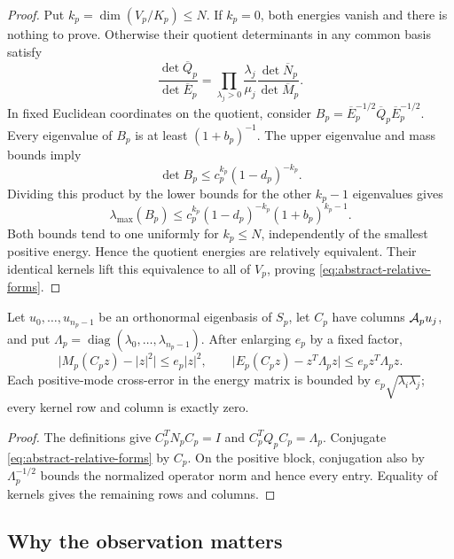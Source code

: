 \begin{proof}
Put $k_p=\dim(V_p/K_p)\le N$. If $k_p=0$, both energies vanish and
there is nothing to prove. Otherwise their quotient determinants in
any common basis satisfy
\begin{equation}\label{eq:quotient-determinant}
 \frac{\det\overline Q_p}{\det\overline E_p}
   =\prod_{\lambda_j>0}\frac{\lambda_j}{\mu_j}
           \frac{\det\overline N_p}{\det\overline M_p}.
\end{equation}
In fixed Euclidean coordinates on the quotient, consider
$B_p=\overline E_p^{-1/2}\overline Q_p\overline E_p^{-1/2}$.
Every eigenvalue of $B_p$ is at least $(1+b_p)^{-1}$. The upper
eigenvalue and mass bounds imply
\[
 \det B_p\le c_p^{k_p}(1-d_p)^{-k_p}.
\]
Dividing this product by the lower bounds for the other $k_p-1$
eigenvalues gives
\begin{equation}\label{eq:determinant-upgrade}
 \lambda_{\max}(B_p)
       \le c_p^{k_p}(1-d_p)^{-k_p}(1+b_p)^{k_p-1}.
\end{equation}
Both bounds tend to one uniformly for $k_p\le N$, independently of
the smallest positive energy. Hence the quotient energies are
relatively equivalent. Their identical kernels lift this equivalence
to all of $V_p$, proving \eqref{eq:abstract-relative-forms}.
\end{proof}

\begin{corollary}\label{cor:observed-matrices}
Let $u_0,\ldots,u_{n_p-1}$ be an orthonormal eigenbasis of $S_p$,
let $C_p$ have columns $\mathcal A_pu_j$, and put
$\Lambda_p=\operatorname{diag}(\lambda_0,\ldots,\lambda_{n_p-1})$.
After enlarging $e_p$ by a fixed factor,
\begin{equation}\label{eq:general-observed-matrices}
 \bigl|M_p(C_pz)-|z|^2\bigr|\le e_p|z|^2,\qquad
 \bigl|E_p(C_pz)-z^T\Lambda_pz\bigr|
                            \le e_p z^T\Lambda_pz.
\end{equation}
Each positive-mode cross-error in the energy matrix is bounded by
$e_p\sqrt{\lambda_i\lambda_j}$; every kernel row and column is
exactly zero.
\end{corollary}
\begin{proof}
The definitions give $C_p^TN_pC_p=I$ and $C_p^TQ_pC_p=\Lambda_p$.
Conjugate \eqref{eq:abstract-relative-forms} by $C_p$. On the positive
block, conjugation also by $\Lambda_p^{-1/2}$ bounds the normalized
operator norm and hence every entry. Equality of kernels gives the
remaining rows and columns.
\end{proof}

\subsection{Why the observation matters}

